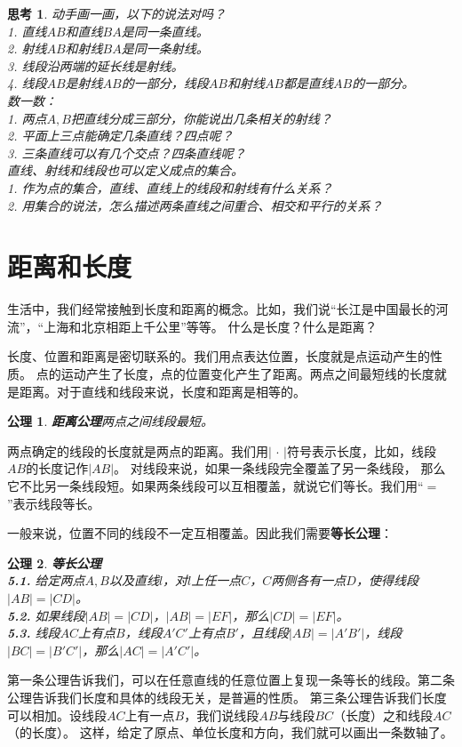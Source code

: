 \documentclass[12pt,UTF8]{ctexbook}
\newtheorem{sk}{思考}[section]
\newtheorem{po}{公理}
\begin{document}
\begin{sk}\label{sk:0-0-0}
    动手画一画，以下的说法对吗？\\
    1. 直线$AB$和直线$BA$是同一条直线。\\
    2. 射线$AB$和射线$BA$是同一条射线。\\
    3. 线段沿两端的延长线是射线。\\
    4. 线段$AB$是射线$AB$的一部分，线段$AB$和射线$AB$都是直线$AB$的一部分。\\
    数一数：\\
    1. 两点$A,B$把直线分成三部分，你能说出几条相关的射线？\\
    2. 平面上三点能确定几条直线？四点呢？\\
    3. 三条直线可以有几个交点？四条直线呢？\\
    直线、射线和线段也可以定义成点的集合。\\
    1. 作为点的集合，直线、直线上的线段和射线有什么关系？\\
    2. 用集合的说法，怎么描述两条直线之间重合、相交和平行的关系？
\end{sk}

\section{距离和长度}

生活中，我们经常接触到长度和距离的概念。比如，我们说“长江是中国最长的河流”，“上海和北京相距上千公里”等等。
什么是长度？什么是距离？

长度、位置和距离是密切联系的。我们用点表达位置，长度就是点运动产生的性质。
点的运动产生了长度，点的位置变化产生了距离。两点之间最短线的长度就是距离。对于直线和线段来说，长度和距离是相等的。
\begin{po}{\textbf{距离公理}}\label{po:3}
    两点之间线段最短。
\end{po}
两点确定的线段的长度就是两点的距离。我们用$ |\, \cdot\,|$符号表示长度，比如，线段$AB$的长度记作$|AB|$。
对线段来说，如果一条线段完全覆盖了另一条线段，
那么它不比另一条线段短。如果两条线段可以互相覆盖，就说它们等长。我们用“$=$”表示线段等长。

一般来说，位置不同的线段不一定互相覆盖。因此我们需要\textbf{等长公理}：
\begin{po}{\textbf{等长公理}}\label{po:4}
    \mbox{}\\
    \indent \textbf{5.1.} 给定两点$A,B$以及直线$l$，对$l$上任一点$C$，$C$两侧各有一点$D$，使得线段$|AB| = |CD|$。\\
    \indent \textbf{5.2.} 如果线段$|AB| = |CD|$，$|AB| = |EF|$，那么$|CD| = |EF|$。\\
    \indent \textbf{5.3.} 线段$AC$上有点$B$，线段$A'C'$上有点$B'$，且线段$|AB| = |A'B'|$，线段$|BC| = |B'C'|$，那么$|AC| = |A'C'|$。
\end{po}
第一条公理告诉我们，可以在任意直线的任意位置上复现一条等长的线段。第二条公理告诉我们长度和具体的线段无关，是普遍的性质。
第三条公理告诉我们长度可以相加。设线段$AC$上有一点$B$，我们说线段$AB$与线段$BC$（长度）之和线段$AC$（的长度）。
这样，给定了原点、单位长度和方向，我们就可以画出一条数轴了。
\end{document}
